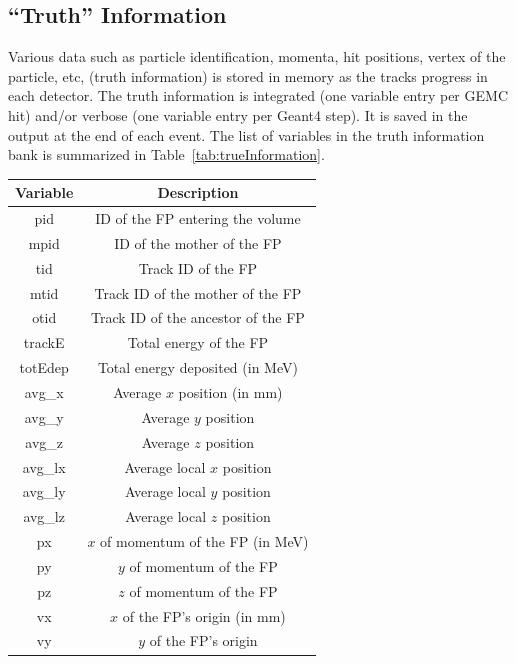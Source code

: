 \subsection{``Truth'' Information}

Various data such as particle identification, momenta, hit positions, vertex of the particle, etc, (truth information) is
stored in memory as the tracks progress in each detector. The truth information is integrated (one variable entry per
GEMC hit) and/or verbose (one variable entry per Geant4 step). It is saved in the output at the end of each event.
The list of variables in the truth information bank is summarized in Table~\ref{tab:trueInformation}.

\begin{table}[h]
	\small
	\begin{center}
		\begin{tabular}{| c | c |}
			\hline \hline
			Variable    & Description  \\
			\hline
				pid         &   ID of the FP entering the volume \\
				mpid        &   ID of the mother of the FP \\
				tid         &   Track ID of the FP\\
				mtid        &   Track ID of the mother of the FP  \\
				otid        &   Track ID of the ancestor of the FP \\
				trackE      &   Total energy of the FP \\
				totEdep     &   Total energy deposited (in MeV) \\
				avg\_x      &   Average $x$ position  (in mm) \\
				avg\_y      &   Average $y$ position  \\
				avg\_z      &   Average $z$ position  \\
				avg\_lx     &   Average local $x$ position \\
				avg\_ly     &   Average local $y$ position \\
				avg\_lz     &   Average local $z$ position \\
				px          &   $x$  of momentum of the FP (in MeV) \\
				py          &   $y$  of momentum of the FP \\
				pz          &   $z$  of momentum of the FP \\
				vx          &   $x$  of the FP's origin (in mm) \\
				vy          &   $y$  of the FP's origin \\

\end{tabular}
\end{center}
\end{table}
